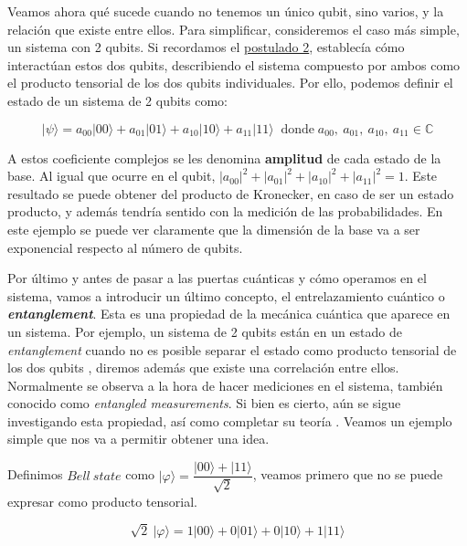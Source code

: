  Veamos ahora qué sucede cuando no tenemos un único qubit, sino varios, y la relación que existe entre ellos. Para simplificar, consideremos el caso más simple, un sistema con 2 qubits. Si recordamos el \hyperref[Postulado2]{postulado 2}, establecía cómo interactúan estos dos qubits, describiendo el sistema compuesto por ambos como el producto tensorial de los dos qubits individuales. Por ello, podemos definir el estado de un sistema de 2 qubits como:

    \begin{equation*}|\psi\rangle = a_{00}|00\rangle + a_{01}|01\rangle + a_{10}|10\rangle + a_{11}|11\rangle \;\;\text{donde}\; a_{00},\: a_{01}, \:a_{10}, \:a_{11} \in \mathbb{C}
    \end{equation*}

 A estos coeficiente complejos se les denomina \textbf{amplitud} de cada estado de la base. Al igual que ocurre en el qubit, $|a_{00}|^{2}+|a_{01}|^{2}+|a_{10}|^{2}+|a_{11}|^{2}=1$. Este resultado se puede obtener del producto de Kronecker, en caso de ser un estado producto, y además tendría sentido con la medición de las probabilidades. En este ejemplo se puede ver claramente que la dimensión de la base va a ser exponencial respecto al número de qubits.\newline
 
 Por último y antes de pasar a las puertas cuánticas y cómo operamos en el sistema, vamos a introducir un último concepto, el entrelazamiento cuántico o \textbf{\textit{entanglement}}. Esta es una propiedad de la mecánica cuántica que aparece en un sistema. Por ejemplo, un sistema de 2 qubits están en un estado de \textit{entanglement} cuando no es posible separar el estado como producto tensorial de los dos qubits \cite{B:QuantumScientist:2008}, diremos además que existe una correlación entre ellos. Normalmente se observa a la hora de hacer mediciones en el sistema, también conocido como \textit{entangled measurements}. Si bien es cierto, aún se sigue investigando esta propiedad, así como completar su teoría \cite{B:Nielsen:2002}. Veamos un ejemplo simple que nos va a permitir obtener una idea. \newline

 Definimos $Bell\:state $ como $|\varphi\rangle= \dfrac{|00\rangle + |11\rangle}{\sqrt{2}}$, veamos primero que no se puede expresar como producto tensorial. 

 \begin{equation}
     \sqrt{2}\:|\varphi\rangle = 1|00\rangle+ 0|01\rangle+ 0|10\rangle+ 1|11\rangle
 \end{equation}
 
